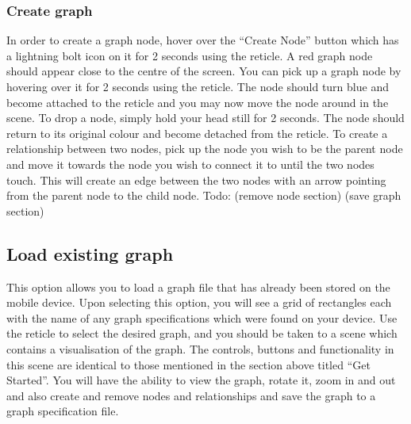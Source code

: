 \documentclass[english]{article}
\begin{document}
\subsubsection{Create graph}
In order to create a graph node, hover over the “Create Node” button which has a lightning bolt icon on it for 2 seconds using the reticle. A red graph node should appear close to the centre of the screen. You can pick up a graph node by hovering over it for 2 seconds using the reticle. The node should turn blue and become attached to the reticle and you may now move the node around in the scene. To drop a node, simply hold your head still for 2 seconds. The node should return to its original colour and become detached from the reticle. To create a relationship between two nodes, pick up the node you wish to be the parent node and move it towards the node you wish to connect it to until the two nodes touch. This will create an edge between the two nodes with an arrow pointing from the parent node to the child node.
Todo: 
(remove node section)
(save graph section)

\subsection{Load existing graph}
This option allows you to load a graph file that has already been stored on the mobile device. Upon selecting this option, you will see a grid of rectangles each with the name of any graph specifications which were found on your device. Use the reticle to select the desired graph, and you should be taken to a scene which contains a visualisation of the graph. The controls, buttons and functionality in this scene are identical to those mentioned in the section above titled “Get Started”. You will have the ability to view the graph, rotate it, zoom in and out and also create and remove nodes and relationships and save the graph to a graph specification file.
\end{document}
